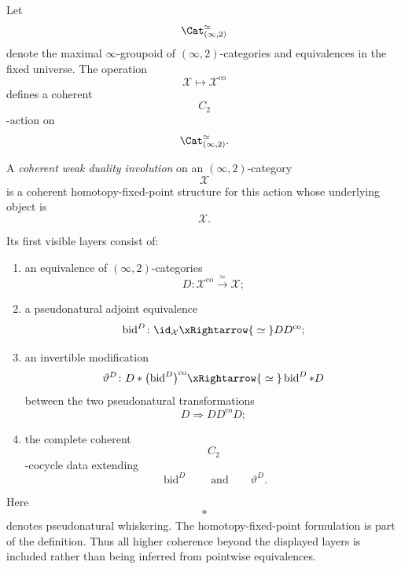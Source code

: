 \begin{definition}
\label{def:coherent-weak-duality-involution}
Let
\[
    \Cat_{(\infty,2)}^\simeq
\]
denote the maximal $\infty$-groupoid of $(\infty,2)$-categories and
equivalences in the fixed universe. The operation
\[
    \mathcal X
    \longmapsto
    \mathcal X^{\mathrm{co}}
\]
defines a coherent
\[
    C_2
\]
-action on
\[
    \Cat_{(\infty,2)}^\simeq.
\]

A \emph{coherent weak duality involution} on an $(\infty,2)$-category
\[
    \mathcal X
\]
is a coherent homotopy-fixed-point structure for this action whose
underlying object is
\[
    \mathcal X.
\]

Its first visible layers consist of:
\begin{enumerate}[label=(\roman*)]
    \item an equivalence of $(\infty,2)$-categories
    \[
        D
        \colon
        \mathcal X^{\mathrm{co}}
        \xrightarrow{\;\simeq\;}
        \mathcal X;
    \]

    \item a pseudonatural adjoint equivalence
    \[
        \operatorname{bid}^{D}
        \colon
        \id_{\mathcal X}
        \xRightarrow{\;\simeq\;}
        D D^{\mathrm{co}};
    \]

    \item an invertible modification
    \[
        \vartheta^{D}
        \colon
        D\ast
        \bigl(
            \operatorname{bid}^{D}
        \bigr)^{\mathrm{co}}
        \xRightarrow{\;\simeq\;}
        \operatorname{bid}^{D}\ast D
    \]
    between the two pseudonatural transformations
    \[
        D
        \Longrightarrow
        D D^{\mathrm{co}}D;
    \]

    \item the complete coherent
    \[
        C_2
    \]
    -cocycle data extending
    \[
        \operatorname{bid}^{D}
        \qquad\text{and}\qquad
        \vartheta^{D}.
    \]
\end{enumerate}

Here
\[
    \ast
\]
denotes pseudonatural whiskering. The homotopy-fixed-point formulation is
part of the definition. Thus all higher coherence beyond the displayed
layers is included rather than being inferred from pointwise
equivalences.
\end{definition}

